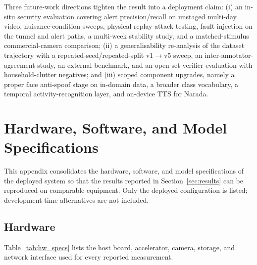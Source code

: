 \documentclass{ieeeaccess}
\begin{document}
Three future-work directions tighten the result into a deployment claim: (i) an in-situ security evaluation covering alert precision/recall on unstaged multi-day video, nuisance-condition sweeps, physical replay-attack testing, fault injection on the tunnel and alert paths, a multi-week stability study, and a matched-stimulus commercial-camera comparison; (ii) a generalisability re-analysis of the dataset trajectory with a repeated-seed/repeated-split v1$\rightarrow$v5 sweep, an inter-annotator-agreement study, an external benchmark, and an open-set verifier evaluation with household-clutter negatives; and (iii) scoped component upgrades, namely a proper face anti-spoof stage on in-domain data, a broader class vocabulary, a temporal activity-recognition layer, and on-device TTS for Narada.



\appendices
\section{Hardware, Software, and Model Specifications}
\label{sec:specs}
This appendix consolidates the hardware, software, and model specifications of the deployed system so that the results reported in Section~\ref{sec:results} can be reproduced on comparable equipment. Only the deployed configuration is listed; development-time alternatives are not included.

\subsection{Hardware}
Table~\ref{tab:hw_specs} lists the host board, accelerator, camera, storage, and network interface used for every reported measurement.
\end{document}
